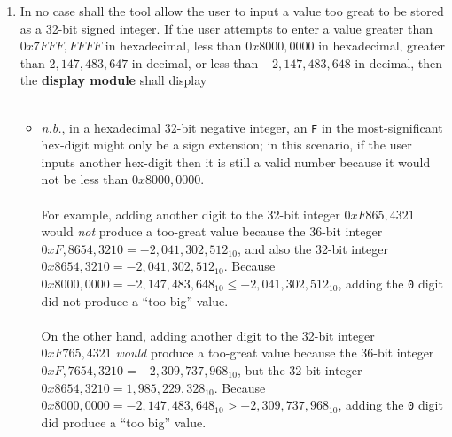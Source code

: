 \begin{enumerate}
\begin{enumerate}
        \item \label{spec:tooBig} In no case shall the tool allow the user to input a value too great to be stored as a 32-bit signed integer.
            If the user attempts to enter a value greater than $0x7FFF,FFFF$ in hexadecimal, less than $0x8000,0000$ in hexadecimal, greater than $2,147,483,647$ in decimal, or less than $-2,147,483,648$ in decimal, then the \textbf{display module} shall display \\
             \\
        \begin{itemize}
            \item \textit{n.b.}, in a hexadecimal 32-bit negative integer, an \texttt{F} in the most-significant hex-digit might only be a sign extension;
                in this scenario, if the user inputs another hex-digit then it is still a valid number because it would not be less than $0x8000,0000$. \\ \\
                For example, adding another digit to the 32-bit integer $0xF865,4321$ would \textit{not} produce a too-great value because the 36-bit integer $0xF,8654,3210 = -2,041,302,512_{10}$, and also the 32-bit integer $0x8654,3210 = -2,041,302,512_{10}$.
                Because $0x8000,0000 = -2,147,483,648_{10} \leq -2,041,302,512_{10}$, adding the \texttt{0} digit did not produce a ``too big'' value. \\ \\
                On the other hand, adding another digit to the 32-bit integer $0xF765,4321$ \textit{would} produce a too-great value because the 36-bit integer $0xF,7654,3210 = -2,309,737,968_{10}$, but the 32-bit integer $0x8654,3210 = 1,985,229,328_{10}$.
                Because $0x8000,0000 = -2,147,483,648_{10} > -2,309,737,968_{10}$, adding the \texttt{0} digit did produce a ``too big'' value.
            \end{itemize}
        \end{enumerate}

\end{enumerate}
